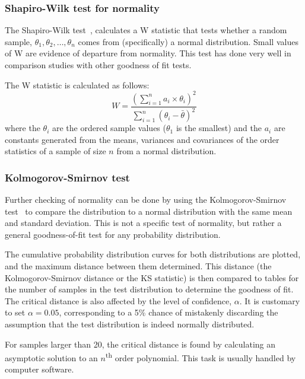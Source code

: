 \subsubsection{Shapiro-Wilk test for normality}\label{sec:shapiro-wilk-test}
The Shapiro-Wilk test~\citep{shapiro.wilk1965analysis}, calculates a W statistic that tests whether a random sample, $\theta_1, \theta_2, \dots, \theta_n$ comes from (specifically) a normal distribution.  
Small values of W are evidence of departure from normality.  
This test has done very well in comparison studies with other goodness of fit tests.

The W statistic is calculated as follows: 
\begin{equation} 
  \label{eq:shipirowilk} 
  W = \frac{
    \left( \displaystyle \sum_{i=1}^n {a_i \times \theta_i} \right)^2}
  {\displaystyle \sum_{i=1}^n 
    \left ( \theta_i - \bar{\theta} \right )^2}
\end{equation}
where the $\theta_i$ are the ordered sample values ($\theta_1$ is the smallest) and the $a_i$ are constants generated from the means, variances and covariances of the order statistics of a sample of size $n$ from a normal distribution.

\subsubsection{Kolmogorov-Smirnov test}\label{sec:kolm-smirn-test}
Further checking of normality can be done by using the Kolmogorov-Smirnov test~\citep[392--394]{chakravarti.laha.ea1967handbook} to compare the distribution to a normal distribution with the same mean and standard deviation.
This is not a specific test of normality, but rather a general goodness-of-fit test for any probability distribution.

The cumulative probability distribution curves for both distributions are plotted, and the maximum distance between them determined.  
This distance (the Kolmogorov-Smirnov distance or the KS statistic) is then compared to tables for the number of samples in the test distribution to determine the goodness of fit.  
The critical distance is also affected by the level of confidence, $\alpha$.  
It is customary to set $\alpha=\num{0.05}$, corresponding to a 5\% chance of mistakenly discarding the assumption that the test distribution is indeed normally distributed.

For samples larger than 20, the critical distance is found by calculating an asymptotic solution to an $n$\textsuperscript{th} order polynomial.  
This task is usually handled by computer software.

